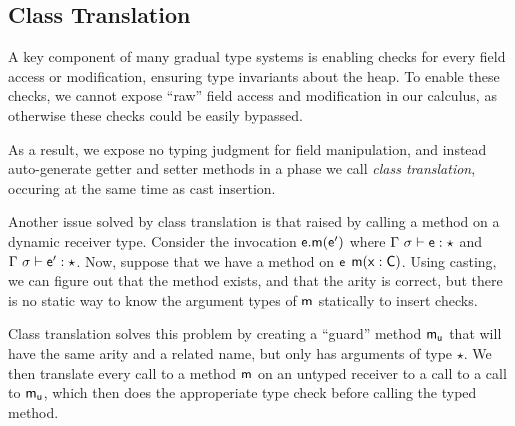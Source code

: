 \documentclass[preprint]{sigplanconf}
\newcommand{\m}{\M{\xt{m}}}
\newcommand{\e}{\M{\xt{e}}}
\newcommand{\x}{\M{\xt{x}}}
\newcommand{\C}{\M{\xt{C}}}
\newcommand{\s}{\M{\sigma}}
\newcommand{\Call}[3]{\M{#1.#2(#3)}}
\newcommand{\any}{\M{\star}}
\newcommand{\M}[1]{\ensuremath{#1}\xspace}
\newcommand{\xt}[1]{{\sf{#1}}\xspace}
\newcommand{\EnvType}[3]{ \M{#1 \vdash #2 : #3}}
\newcommand{\E}{\M{\Gamma}}
\newcommand{\Es}{\E ~\s}
\begin{document}
\subsection{Class Translation}

A key component of many gradual type systems is enabling checks for every field access or modification,
ensuring type invariants about the heap. To enable these checks, we cannot expose ``raw'' field access
and modification in our calculus, as otherwise these checks could be easily bypassed.

As a result, we expose no typing judgment for field manipulation, and instead auto-generate getter and 
setter methods in a phase we call \emph{class translation}, occuring at the same time as cast insertion.

Another issue solved by class translation is that raised by calling a method on a dynamic receiver type.
Consider the invocation $\Call{\e}{\m}{\e'}$ where $\EnvType{\Es}{\e}{\any}$ and $\EnvType{\Es}{\e'}{\any}$. 
Now, suppose that we have a method on $\e$ $\m(\x:\C)$. Using casting, we can figure out that the method exists,
and that the arity is correct, but there is no static way to know the argument types of $\m$ statically to 
insert checks.

Class translation solves this problem by creating a ``guard'' method $\m_\xt{u}$ that will have the same
arity and a related name, but only has arguments of type $\any$. We then translate every call to a method
$\m$ on an untyped receiver to a call to a call to $\m_\xt{u}$, which then does the approperiate type check
before calling the typed method.

\newcommand{\ESub}[3]{#1 \vdash #2 \leq #3}
\end{document}
